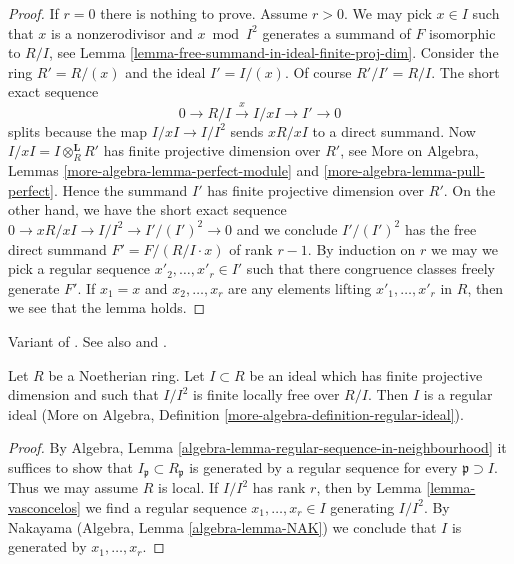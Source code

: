 \begin{proof}
If $r = 0$ there is nothing to prove. Assume $r > 0$. We may pick
$x \in I$ such that $x$ is a nonzerodivisor and $x \bmod I^2$
generates a summand of $F$ isomorphic to $R/I$, see
Lemma \ref{lemma-free-summand-in-ideal-finite-proj-dim}.
Consider the ring $R' = R/(x)$ and the ideal $I' = I/(x)$.
Of course $R'/I' = R/I$. The short exact sequence
$$
0 \to R/I \xrightarrow{x} I/xI \to I' \to 0
$$
splits because the map $I/xI \to I/I^2$ sends $xR/xI$
to a direct summand. Now $I/xI = I \otimes_R^\mathbf{L} R'$ has
finite projective dimension over $R'$, see
More on Algebra, Lemmas \ref{more-algebra-lemma-perfect-module} and
\ref{more-algebra-lemma-pull-perfect}.
Hence the summand $I'$ has finite projective dimension over $R'$.
On the other hand, we have the short exact sequence
$0 \to xR/xI \to I/I^2 \to I'/(I')^2 \to 0$ and we conclude
$I'/(I')^2$ has the free direct summand $F' = F/(R/I \cdot x)$
of rank $r - 1$. By induction on $r$ we may
we pick a regular sequence $x'_2, \ldots, x'_r \in I'$
such that there congruence classes freely generate $F'$.
If $x_1 = x$ and $x_2, \ldots, x_r$ are any elements lifting
$x'_1, \ldots, x'_r$ in $R$, then we see that the lemma holds.
\end{proof}

\begin{proposition}
\label{proposition-regular-ideal}
\begin{reference}
Variant of \cite[Corollary 1]{Vasconcelos}. See also
\cite{Iyengar} and \cite{Ferrand-lci}.
\end{reference}
Let $R$ be a Noetherian ring. Let $I \subset R$ be an ideal
which has finite projective dimension and such that $I/I^2$ is
finite locally free over $R/I$. Then $I$ is a regular ideal
(More on Algebra, Definition \ref{more-algebra-definition-regular-ideal}).
\end{proposition}

\begin{proof}
By Algebra, Lemma \ref{algebra-lemma-regular-sequence-in-neighbourhood}
it suffices to show that $I_\mathfrak p \subset R_\mathfrak p$ is generated
by a regular sequence for every $\mathfrak p \supset I$. Thus we may
assume $R$ is local. If $I/I^2$ has rank $r$, then by
Lemma \ref{lemma-vasconcelos} we find a regular sequence
$x_1, \ldots, x_r \in I$ generating $I/I^2$. By
Nakayama (Algebra, Lemma \ref{algebra-lemma-NAK})
we conclude that $I$ is generated by $x_1, \ldots, x_r$.
\end{proof}

